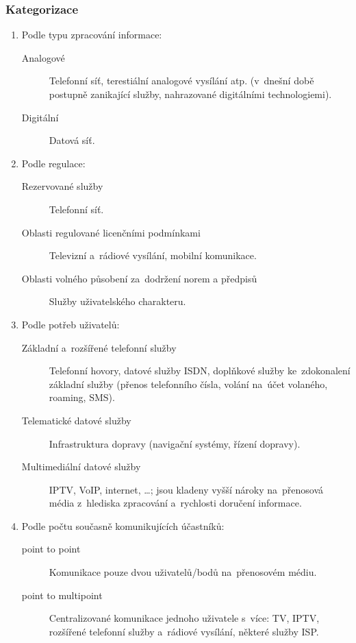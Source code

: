 \subsubsection{Kategorizace}
\begin{enumerate}
    \item Podle typu zpracování informace:
          \begin{description}
              \item[Analogové] Telefonní síť, terestiální analogové vysílání atp. (v~dnešní době postupně zanikající služby, nahrazované digitálními technologiemi).
              \item[Digitální] Datová síť.
          \end{description}
    \item Podle regulace:
          \begin{description}
              \item[Rezervované služby] Telefonní síť.
              \item[Oblasti regulované licenčními podmínkami] Televizní a~rádiové vysílání, mobilní komunikace.
              \item[Oblasti volného působení za~dodržení norem a předpisů] Služby uživatelského charakteru.
          \end{description}
    \item Podle potřeb uživatelů:
          \begin{description}
              \item[Základní a~rozšířené telefonní služby] Telefonní hovory, datové služby ISDN, doplňkové služby ke~zdokonalení základní služby (přenos telefonního čísla, volání na~účet volaného, roaming, SMS).
              \item[Telematické datové služby] Infrastruktura dopravy (navigační systémy, řízení dopravy).
              \item[Multimediální datové služby] IPTV, VoIP, internet, \dots; jsou kladeny vyšší nároky na~přenosová média z~hlediska zpracování a~rychlosti doručení informace.
          \end{description}
    \item Podle počtu současně komunikujících účastníků:
          \begin{description}
              \item[point to point] Komunikace pouze dvou uživatelů/bodů na~přenosovém médiu.
              \item[point to multipoint] Centralizované komunikace jednoho uživatele s~více: TV, IPTV, rozšířené telefonní služby a~rádiové vysílání, některé služby ISP.

\end{description}
\end{enumerate}
